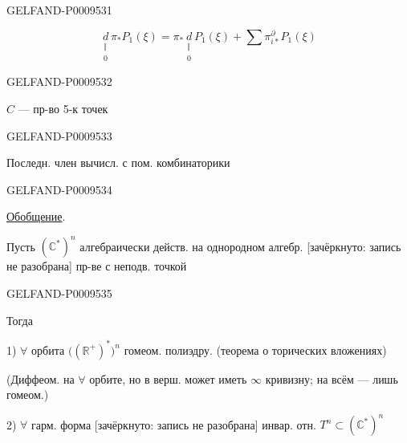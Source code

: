 \begin{GelfandAdjacentEvidence}{GELFAND-P000953}{1}

\[
 \underset{\substack{\Vert\\0}}{d}\pi_*P_1(\xi)
 =\pi_*\underset{\substack{\Vert\\0}}{d}P_1(\xi)
 +\sum\pi_{i*}^{\partial}P_1(\xi)
\]
\end{GelfandAdjacentEvidence}
\begin{GelfandAdjacentEvidence}{GELFAND-P000953}{2}

$C$ --- пр-во 5-к точек

\end{GelfandAdjacentEvidence}
\begin{GelfandAdjacentEvidence}{GELFAND-P000953}{3}


Последн. член вычисл. с пом. комбинаторики
\end{GelfandAdjacentEvidence}
\begin{GelfandAdjacentEvidence}{GELFAND-P000953}{4}


\underline{Обобщение}.

Пусть $(\mathbb C^*)^n$ алгебраически действ. на однородном алгебр. [зачёркнуто: запись не разобрана] пр-ве с неподв. точкой
\end{GelfandAdjacentEvidence}
\begin{GelfandAdjacentEvidence}{GELFAND-P000953}{5}


Тогда

1) $\forall$ орбита $\bigl((\mathbb R^+)^*\bigr)^n$ гомеом. полиэдру.
(теорема о торических вложениях)

(Диффеом. на $\forall$ орбите, но в верш. может иметь $\infty$ кривизну; на всём --- лишь гомеом.)

2) $\forall$ гарм. форма [зачёркнуто: запись не разобрана]
инвар. отн. $T^n\subset(\mathbb C^*)^n$
\end{GelfandAdjacentEvidence}
